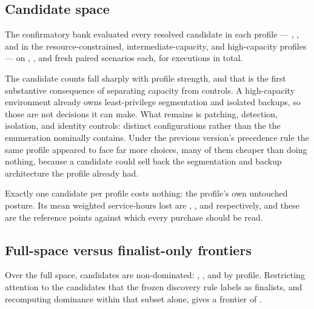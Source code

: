 \subsection{Candidate space}

The confirmatory bank evaluated every resolved candidate in each profile ---
\ConfirmResourceConstrainedCandidates{}, \ConfirmIntermediateCandidates{},
and \ConfirmHighCapacityCandidates{} in the resource-constrained,
intermediate-capacity, and high-capacity profiles --- on
\ConfirmResourceConstrainedScenarios{}, \ConfirmIntermediateScenarios{}, and
\ConfirmHighCapacityScenarios{} fresh paired scenarios each, for
\ConfirmTotalExecutions{} executions in total.

The candidate counts fall sharply with profile strength, and that is the
first substantive consequence of separating capacity from controls. A
high-capacity environment already owns least-privilege segmentation and
isolated backups, so those are not decisions it can make. What remains is
patching, detection, isolation, and identity controls:
\ConfirmHighCapacityCandidates{} distinct configurations rather than the
\EnumeratedPortfolios{} the enumeration nominally contains. Under the
previous version's precedence rule the same profile appeared to face far
more choices, many of them cheaper than doing nothing, because a candidate
could sell back the segmentation and backup architecture the profile already
had.

Exactly one candidate per profile costs nothing: the profile's own untouched
posture. Its mean weighted service-hours lost are
\ConfirmResourceConstrainedFreeBaselineMeanLoss{},
\ConfirmIntermediateFreeBaselineMeanLoss{}, and
\ConfirmHighCapacityFreeBaselineMeanLoss{} respectively, and these are the
reference points against which every purchase should be read.

\subsection{Full-space versus finalist-only frontiers}

Over the full space, \ConfirmFullSpaceFrontier{} candidates are
non-dominated: \ConfirmResourceConstrainedNonDominated{},
\ConfirmIntermediateNonDominated{}, and \ConfirmHighCapacityNonDominated{} by
profile. Restricting attention to the \ConfirmFinalistLabelled{} candidates
that the frozen discovery rule labels as finalists, and recomputing dominance
within that subset alone, gives a frontier of \ConfirmFinalistOnlyFrontier{}.

